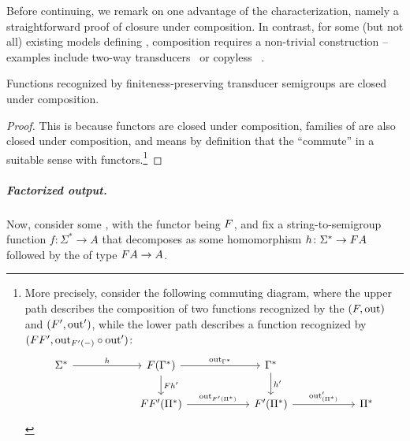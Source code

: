 Before continuing, we remark on one advantage of the characterization, namely a
straightforward proof of closure under composition. In contrast, for some (but
not all) existing models defining ,
composition requires a non-trivial construction -- examples include two-way
transducers~\cite[Theorem 2]{ChytilJ77} or copyless \sst~\cite[Theorem
1]{composingSST}.
\begin{proposition}\label{prop:composition}
  Functions recognized by finiteness-preserving transducer semigroups are closed
  under composition.
\end{proposition}
\begin{proof}
  This is because  functors are closed under composition,
   families of  are also closed under composition, and 
  means by definition that the  \enquote{commute} in a suitable
  sense with functors.\footnote{More precisely, consider the following commuting  diagram,
    where the upper path describes the composition of two functions recognized by the
     $(\functor,\outfun)$ and $(\functor',\outfun')$, while the lower path describes a function recognized by $(\functor\functor', \outfun_{\functor'(-)} \circ \outfun')$:
    \[
      \begin{tikzcd}[ampersand replacement=\&, column sep=2cm]
        \Sigma^* 
        \ar[r,"h"]
        \& 
        \functor(\Gamma^*)
        \ar[r,"\outfun_{\Gamma^*}"]
        \ar[d,"\functor h'"]
        \&
        \Gamma^* \ar[d,"h'"]\\
        \&
        \functor\functor'(\Pi^*) \ar[r,"\outfun_{\functor'(\Pi^*)}"]
        \& 
        \functor'(\Pi^*)
        \ar[r,"\outfun'_{(\Pi^*)}"]
        \&
        \Pi^*
      \end{tikzcd}
  \]}
\end{proof}





\subparagraph{Factorized output.}
Now, consider some , with the functor being $\functor$, and fix a string-to-semigroup function $f\colon \Sigma^* \to A$ that decomposes as some homomorphism $h\colon \Sigma^* \to \functor A$ followed by the  of type $\functor A \to A$. 

